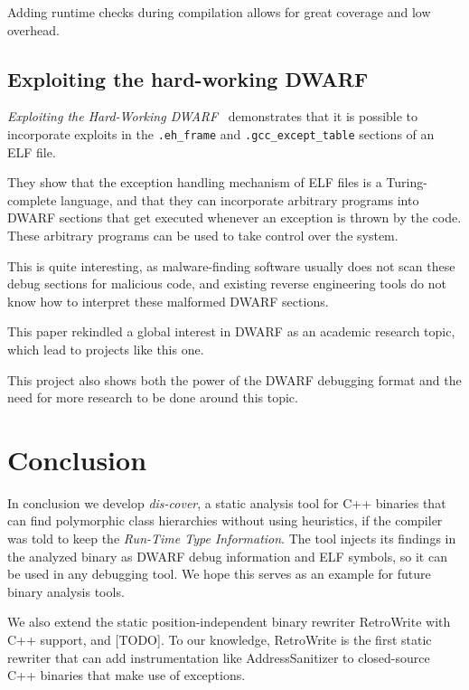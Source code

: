 \documentclass[a4paper,11pt,oneside]{report}
\begin{document}
Adding runtime checks during compilation allows for great coverage and low
overhead.


\section{Exploiting the hard-working DWARF}

\emph{Exploiting the Hard-Working DWARF}~\cite{hardworkingdwarf}
demonstrates that it is possible to incorporate exploits in the
\texttt{.eh\_frame} and \texttt{.gcc\_except\_table} sections of an ELF file.

They show that the exception handling mechanism of ELF files is a
Turing-complete language, and that they can incorporate arbitrary programs
into DWARF sections that get executed whenever an exception is thrown by the
code.
These arbitrary programs can be used to take control over the system.

This is quite interesting, as malware-finding software usually does not scan
these debug sections for malicious code, and existing reverse engineering
tools do not know how to interpret these malformed DWARF sections.

This paper rekindled a global interest in DWARF as an academic research topic,
which lead to projects like this one.

This project also shows both the power of the DWARF debugging format and the
need for more research to be done around this topic.

\chapter{Conclusion}


In conclusion we develop \emph{dis-cover}, a static analysis tool for C++
binaries that can find polymorphic class hierarchies without using heuristics,
if the compiler was told to keep the \emph{Run-Time Type Information}.
The tool injects its findings in the analyzed binary as DWARF debug
information and ELF symbols, so it can be used in any debugging tool.
We hope this serves as an example for future binary analysis tools.

We also extend the static position-independent binary rewriter RetroWrite with
C++ support, and [TODO].
To our knowledge, RetroWrite is the first static rewriter that can add
instrumentation like AddressSanitizer to closed-source C++ binaries that make
use of exceptions.
\end{document}
